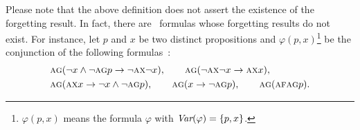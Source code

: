 \documentclass[twoside,11pt]{article}
\begin{document}
Please note  that the above definition does not assert the existence of the forgetting result.
In fact, there are \CTL\ formulas whose forgetting results do not exist. %
%
For instance,  let $p$ and $x$ be two distinct propositions and $\varphi(p,x)$\footnote{$\varphi(p,x)$ means the formula $\varphi$ with $\textit{Var}(\varphi)=\{p,x\}$.}
be the conjunction of the following formulas~\cite{Maksimova:JANCL:1991}:
\begin{align*}
      &\textsc{a}\textsc{g}(\neg x \wedge \neg \textsc{a} \textsc{g} p \rightarrow \neg \textsc{a} \textsc{x} \neg x),
      \qquad \textsc{a}\textsc{g}(\neg \textsc{a}\textsc{x} \neg x \rightarrow \textsc{a} \textsc{x} x),\\
      & \textsc{a}\textsc{g}(\textsc{a}\textsc{x} x \rightarrow \neg x \wedge \neg \textsc{a} \textsc{g} p),
      \qquad \textsc{a}\textsc{g}(x \rightarrow \neg \textsc{a}\textsc{g} p),
      \qquad \textsc{a}\textsc{g}(\textsc{a} \textsc{f} \textsc{a} \textsc{g} p).
\end{align*}
\end{document}
